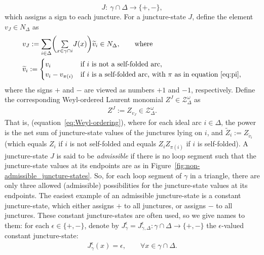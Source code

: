 \documentclass[pdftex]{sigma}
\numberwithin{equation}{section}
\theoremstyle{definition}
\newcommand{\til}[1]{\widetilde{#1}}
\begin{document}
\[
J \colon \ \gamma \cap \Delta \to \{+,-\},
\]
which assigns a sign to each juncture. For a juncture-state $J$, define the element $v_J \in N_\Delta$ as
\begin{align}
\label{eq:v_J}
&v_J := \sum_{i\in \Delta} \biggl( \underset{x\in \gamma \cap i}{\textstyle \sum} J(x) \biggr) \til{v}_i \in N_\Delta, \qquad \mbox{where} \\
\label{eq:til_v_i}
&\til{v}_i := \begin{cases}
v_i & \mbox{if } i \mbox{ is not a self-folded arc}, \\
v_i - v_{\pi(i)} & \mbox{if } i \mbox{ is a self-folded arc, with } \pi \mbox{ as in equation}~\eqref{eq:pi},
\end{cases}
\end{align}
where the signs $+$ and $-$ are viewed as numbers $+1$ and $-1$, respectively. Define the corresponding Weyl-ordered Laurent monomial $Z^J \in \mathcal{Z}^\omega_\Delta$ as
\begin{align}
\label{eq:Z_J}
Z^J := Z_{v_J} \in \mathcal{Z}^\omega_\Delta.
\end{align}
That is, \smash{$Z^J = \bigl[ \prod_{i \in \Delta} \til{Z}_i^{a_i} \bigr]_{\rm Weyl}$} (equation~\eqref{eq:Weyl-ordering}), where for each ideal arc $i\in \Delta$, the power  is the net sum of juncture-state values of the junctures lying on $i$, and $\til{Z}_i := Z_{\til{v}_i}$ (which equals $Z_i$ if $i$ is not self-folded and equals $Z_i Z_{\pi(i)}$ if $i$ is self-folded).
A juncture-state $J$ is said to be {\em admissible} if there is no loop segment such that the juncture-state values at its endpoints are as in Figure~\ref{fig:non-admissible_juncture-states}. So, for each loop segment of $\gamma$ in a triangle, there are only three allowed (admissible) possibilities for the juncture-state values at its endpoints. The easiest example of an admissible juncture-state is a constant juncture-state, which either assigns $+$ to all junctures, or assigns $-$ to all junctures. These constant juncture-states are often used, so we give names to them: for each $\epsilon \in \{+,-\}$, denote by $J^\epsilon_{\gamma} = J^\epsilon_{\gamma,\Delta} \colon \gamma \cap \Delta \to \{+,-\}$ the $\epsilon$-valued constant juncture-state:
\begin{align}
\label{eq:constant_juncture-state}
J_\gamma^\epsilon(x) = \epsilon, \qquad \forall x\in \gamma \cap \Delta.
\end{align}
\end{document}
